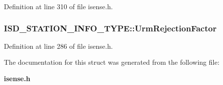 \-Definition at line 310 of file isense.\-h.

\subsubsection[{\-Urm\-Rejection\-Factor}]{ {\bf \-I\-S\-D\-\_\-\-S\-T\-A\-T\-I\-O\-N\-\_\-\-I\-N\-F\-O\-\_\-\-T\-Y\-P\-E\-::\-Urm\-Rejection\-Factor}}\label{structISD__STATION__INFO__TYPE_a9d36c5ce39083a8e2bcf3c3173715330}


\-Definition at line 286 of file isense.\-h.



\-The documentation for this struct was generated from the following file\-:\begin{DoxyCompactItemize}
\item 
{\bf isense.\-h}\end{DoxyCompactItemize}
